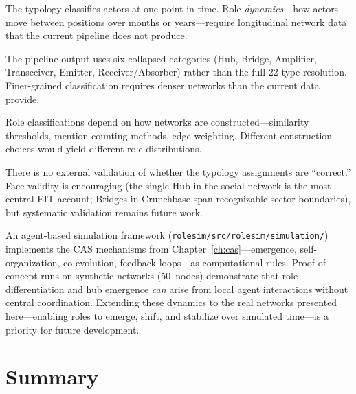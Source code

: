 \documentclass[../main.tex]{subfiles}
\begin{document}
\begin{description}[leftmargin=0.5cm, itemsep=0.3em]
\item[Static snapshot] The typology classifies actors at one point in time.
  Role \emph{dynamics}---how actors move between positions over months or
  years---require longitudinal network data that the current pipeline does
  not produce.

\item[Collapsed categories] The pipeline output uses six collapsed categories
  (Hub, Bridge, Amplifier, Transceiver, Emitter, Receiver/Absorber) rather
  than the full 22-type resolution. Finer-grained classification requires
  denser networks than the current data provide.

\item[Network construction choices] Role classifications depend on how
  networks are constructed---similarity thresholds, mention counting
  methods, edge weighting. Different construction choices would yield
  different role distributions.

\item[No ground truth] There is no external validation of whether the
  typology assignments are ``correct.'' Face validity is encouraging
  (the single Hub in the social network is the most central EIT account;
  Bridges in Crunchbase span recognizable sector boundaries), but
  systematic validation remains future work.
\end{description}

An agent-based simulation framework (\texttt{rolesim/src/rolesim/simulation/})
implements the CAS mechanisms from Chapter~\ref{ch:cas}---emergence,
self-organization, co-evolution, feedback loops---as computational rules.
Proof-of-concept runs on synthetic networks (50~nodes) demonstrate that
role differentiation and hub emergence \emph{can} arise from local agent
interactions without central coordination. Extending these dynamics to the
real networks presented here---enabling roles to emerge, shift, and
stabilize over simulated time---is a priority for future development.


\section*{Summary}
\end{document}
